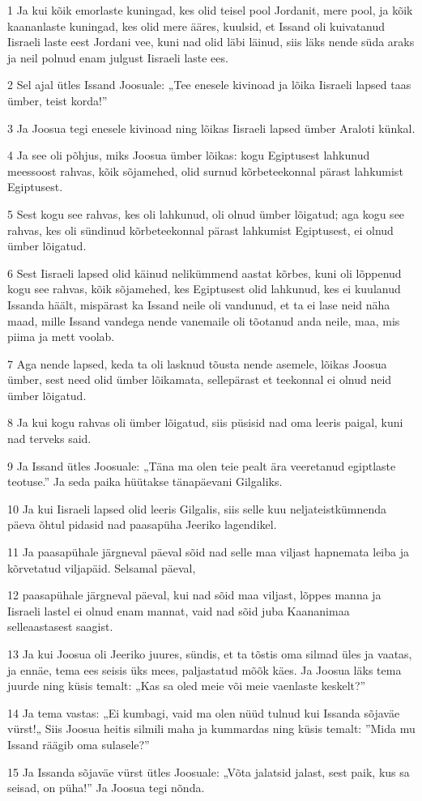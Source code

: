 \par 1 Ja kui kõik emorlaste kuningad, kes olid teisel pool Jordanit, mere pool, ja kõik kaananlaste kuningad, kes olid mere ääres, kuulsid, et Issand oli kuivatanud Iisraeli laste eest Jordani vee, kuni nad olid läbi läinud, siis läks nende süda araks ja neil polnud enam julgust Iisraeli laste ees.
\par 2 Sel ajal ütles Issand Joosuale: „Tee enesele kivinoad ja lõika Iisraeli lapsed taas ümber, teist korda!”
\par 3 Ja Joosua tegi enesele kivinoad ning lõikas Iisraeli lapsed ümber Araloti künkal.
\par 4 Ja see oli põhjus, miks Joosua ümber lõikas: kogu Egiptusest lahkunud meessoost rahvas, kõik sõjamehed, olid surnud kõrbeteekonnal pärast lahkumist Egiptusest.
\par 5 Sest kogu see rahvas, kes oli lahkunud, oli olnud ümber lõigatud; aga kogu see rahvas, kes oli sündinud kõrbeteekonnal pärast lahkumist Egiptusest, ei olnud ümber lõigatud.
\par 6 Sest Iisraeli lapsed olid käinud nelikümmend aastat kõrbes, kuni oli lõppenud kogu see rahvas, kõik sõjamehed, kes Egiptusest olid lahkunud, kes ei kuulanud Issanda häält, mispärast ka Issand neile oli vandunud, et ta ei lase neid näha maad, mille Issand vandega nende vanemaile oli tõotanud anda neile, maa, mis piima ja mett voolab.
\par 7 Aga nende lapsed, keda ta oli lasknud tõusta nende asemele, lõikas Joosua ümber, sest need olid ümber lõikamata, sellepärast et teekonnal ei olnud neid ümber lõigatud.
\par 8 Ja kui kogu rahvas oli ümber lõigatud, siis püsisid nad oma leeris paigal, kuni nad terveks said.
\par 9 Ja Issand ütles Joosuale: „Täna ma olen teie pealt ära veeretanud egiptlaste teotuse.” Ja seda paika hüütakse tänapäevani Gilgaliks.
\par 10 Ja kui Iisraeli lapsed olid leeris Gilgalis, siis selle kuu neljateistkümnenda päeva õhtul pidasid nad paasapüha Jeeriko lagendikel.
\par 11 Ja paasapühale järgneval päeval sõid nad selle maa viljast hapnemata leiba ja kõrvetatud viljapäid. Selsamal päeval,
\par 12 paasapühale järgneval päeval, kui nad sõid maa viljast, lõppes manna ja Iisraeli lastel ei olnud enam mannat, vaid nad sõid juba Kaananimaa selleaastasest saagist.
\par 13 Ja kui Joosua oli Jeeriko juures, sündis, et ta tõstis oma silmad üles ja vaatas, ja ennäe, tema ees seisis üks mees, paljastatud mõõk käes. Ja Joosua läks tema juurde ning küsis temalt: „Kas sa oled meie või meie vaenlaste keskelt?”
\par 14 Ja tema vastas: „Ei kumbagi, vaid ma olen nüüd tulnud kui Issanda sõjaväe vürst!„ Siis Joosua heitis silmili maha ja kummardas ning küsis temalt: ”Mida mu Issand räägib oma sulasele?”
\par 15 Ja Issanda sõjaväe vürst ütles Joosuale: „Võta jalatsid jalast, sest paik, kus sa seisad, on püha!” Ja Joosua tegi nõnda.

